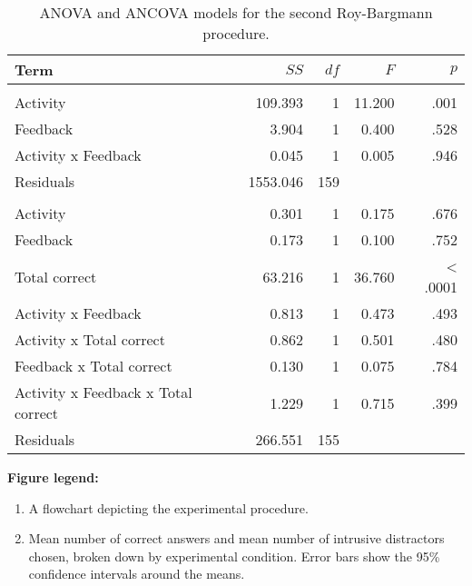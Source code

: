 \documentclass[12pt]{article}
\begin{document}
\begin{table*}

\caption{\label{tab:rb2Table}\label{rb2-table}ANOVA and ANCOVA models for the second Roy-Bargmann
                     procedure.}
\centering
\begin{tabular}[t]{lrrrr}
\toprule
Term & $SS$ & $df$ & $F$ & $p$\\
\midrule
\addlinespace[0.3em]
\multicolumn{5}{l}{\textbf{ANOVA}}\\
\hspace{1em}Activity & 109.393 & 1 & 11.200 & .001\\
\hspace{1em}Feedback & 3.904 & 1 & 0.400 & .528\\
\hspace{1em}Activity x Feedback & 0.045 & 1 & 0.005 & .946\\
\hspace{1em}Residuals & 1553.046 & 159 &  & \\
\addlinespace[0.3em]
\multicolumn{5}{l}{\textbf{ANCOVA}}\\
\hspace{1em}Activity & 0.301 & 1 & 0.175 & .676\\
\hspace{1em}Feedback & 0.173 & 1 & 0.100 & .752\\
\hspace{1em}Total correct & 63.216 & 1 & 36.760 & < .0001\\
\hspace{1em}Activity x Feedback & 0.813 & 1 & 0.473 & .493\\
\hspace{1em}Activity x Total correct & 0.862 & 1 & 0.501 & .480\\
\hspace{1em}Feedback x Total correct & 0.130 & 1 & 0.075 & .784\\
\hspace{1em}Activity x Feedback x Total correct & 1.229 & 1 & 0.715 & .399\\
\hspace{1em}Residuals & 266.551 & 155 &  & \\
\bottomrule
\end{tabular}
\end{table*}

\textbf{Figure legend:}
\begin{enumerate}[label=Figure \arabic*.]
    \item A flowchart depicting the experimental procedure.
    \item Mean number of correct answers and mean number of intrusive
        distractors chosen, broken down by experimental condition. Error bars
        show the 95\% confidence intervals around the means.
\end{enumerate}
\end{document}
